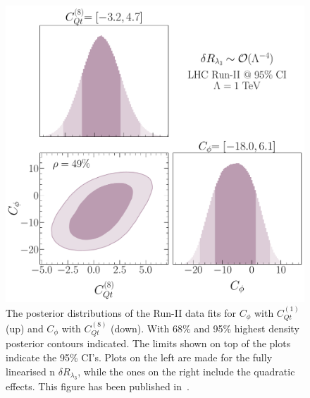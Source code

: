 \begin{figure}[h!]
\begin{center}
		\includegraphics[width=0.45\linewidth]{fig/Cqt8_LHC_RunII_quadl3_rge} 
	\end{center}
\caption{The posterior distributions of the Run-II data fits for $C_\phi$ with $C_{Qt}^{(1)}$ (up) and $C_\phi$ with $C_{Qt}^{(8)}$ (down). With 68\% and 95\% highest density posterior contours indicated. The limits shown on top of the plots indicate the 95\% CI's. Plots on the left are made for the fully linearised n $\delta R_{\lambda_3}$, while the ones on the right include the quadratic effects. This figure has been published in~\cite{Alasfar:2022zyr}. \label{2param-cqt}   }
\end{figure}

